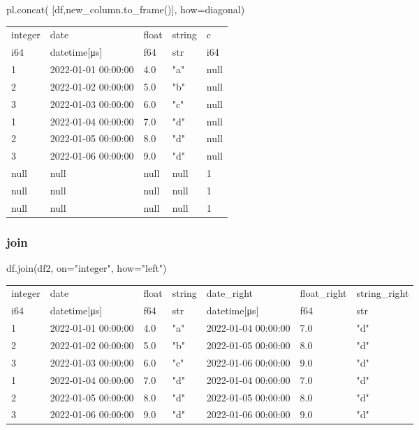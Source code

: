 \documentclass[
  letterpaper,
  DIV=11,
  numbers=noendperiod]{scrartcl}
\newenvironment{Shaded}{\begin{snugshade}}{\end{snugshade}}
\newcommand{\NormalTok}[1]{\textcolor[rgb]{0.00,0.23,0.31}{#1}}
\newcommand{\OperatorTok}[1]{\textcolor[rgb]{0.37,0.37,0.37}{#1}}
\newcommand{\StringTok}[1]{\textcolor[rgb]{0.13,0.47,0.30}{#1}}
\begin{document}
\begin{Shaded}
\begin{Highlighting}[]
\NormalTok{pl.concat(}
\NormalTok{    [df,new\_column.to\_frame()], }
\NormalTok{    how}\OperatorTok{=}\StringTok{\textquotesingle{}diagonal\textquotesingle{}}\NormalTok{)}
\end{Highlighting}
\end{Shaded}

\begin{longtable}[]{@{}lllll@{}}
\toprule()
integer & date & float & string & c \\
i64 & datetime{[}μs{]} & f64 & str & i64 \\
\midrule()
\endhead
1 & 2022-01-01 00:00:00 & 4.0 & "a" & null \\
2 & 2022-01-02 00:00:00 & 5.0 & "b" & null \\
3 & 2022-01-03 00:00:00 & 6.0 & "c" & null \\
1 & 2022-01-04 00:00:00 & 7.0 & "d" & null \\
2 & 2022-01-05 00:00:00 & 8.0 & "d" & null \\
3 & 2022-01-06 00:00:00 & 9.0 & "d" & null \\
null & null & null & null & 1 \\
null & null & null & null & 1 \\
null & null & null & null & 1 \\
\bottomrule()
\end{longtable}

\hypertarget{join}{%
\subsubsection{join}\label{join}}

\begin{Shaded}
\begin{Highlighting}[]
\NormalTok{df.join(df2, on}\OperatorTok{=}\StringTok{"integer"}\NormalTok{, how}\OperatorTok{=}\StringTok{"left"}\NormalTok{)}
\end{Highlighting}
\end{Shaded}

\begin{longtable}[]{@{}lllllll@{}}
\toprule()
integer & date & float & string & date\_right & float\_right &
string\_right \\
i64 & datetime{[}μs{]} & f64 & str & datetime{[}μs{]} & f64 & str \\
\midrule()
\endhead
1 & 2022-01-01 00:00:00 & 4.0 & "a" & 2022-01-04 00:00:00 & 7.0 & "d" \\
2 & 2022-01-02 00:00:00 & 5.0 & "b" & 2022-01-05 00:00:00 & 8.0 & "d" \\
3 & 2022-01-03 00:00:00 & 6.0 & "c" & 2022-01-06 00:00:00 & 9.0 & "d" \\
1 & 2022-01-04 00:00:00 & 7.0 & "d" & 2022-01-04 00:00:00 & 7.0 & "d" \\
2 & 2022-01-05 00:00:00 & 8.0 & "d" & 2022-01-05 00:00:00 & 8.0 & "d" \\
3 & 2022-01-06 00:00:00 & 9.0 & "d" & 2022-01-06 00:00:00 & 9.0 & "d" \\
\bottomrule()
\end{longtable}
\end{document}
